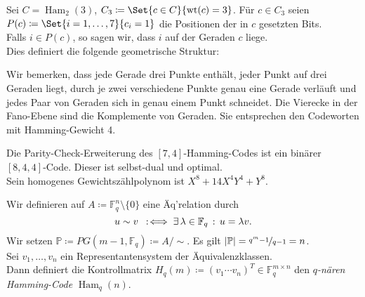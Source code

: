 \documentclass{cheat-sheet}
\newcommand{\F}{\mathbb{F}} %
\DeclareMathOperator{\wt}{wt} %
\DeclareMathOperator{\Ham}{Ham} %
\newcommand{\Proj}{\mathbb{P}} %
\begin{document}
\begin{bem}
  Sei $C = \Ham_2(3)$, $C_3 \coloneqq \Set{c \in C}{\wt(c) = 3}$.
  Für $c \in C_3$ seien $P(c) \coloneqq \Set{i = 1, \ldots, 7}{c_i = 1}$ die Positionen der in $c$ gesetzten Bits. \\
  Falls $i \in P(c)$, so sagen wir, dass $i$ auf der Geraden $c$ liege. \\
  Dies definiert die folgende geometrische Struktur:
\begin{center}
\end{center}
  Wir bemerken, dass jede Gerade drei Punkte enthält, jeder Punkt auf drei Geraden liegt, durch je zwei verschiedene Punkte genau eine Gerade verläuft und jedes Paar von Geraden sich in genau einem Punkt schneidet.
  Die Vierecke in der Fano-Ebene sind die Komplemente von Geraden.
  Sie entsprechen den Codeworten mit Hamming-Gewicht 4.
\end{bem}


\begin{satz}
  Die Parity-Check-Erweiterung des $[7, 4]$-Hamming-Codes ist ein binärer $[8, 4, 4]$-Code.
  Dieser ist selbst-dual und optimal. \\
  Sein homogenes Gewichtszählpolynom ist $X^8 + 14 X^4 Y^4 + Y^8$.
\end{satz}


\begin{konstr}
  Wir definieren auf $A \coloneqq \F_q^n \setminus \{ 0 \}$ eine Äq'relation durch
  \[ u \sim v \coloniff \ex{\lambda \in \F_q} u = \lambda v. \]
  Wir setzen $\Proj \coloneqq PG(m-1, \F_q) \coloneqq A/{\sim}$.
  Es gilt $\abs{\Proj} = \nicefrac{q^m - 1}{q - 1} = n$. \\
  Sei $v_1, \ldots, v_n$ ein Representantensystem der Äquivalenzklassen. \\
  Dann definiert die Kontrollmatrix $H_q(m) \coloneqq (v_1 \cdots v_n)^T \in \F_q^{m \times n}$ den \emph{$q$-nären Hamming-Code} $\Ham_q(n)$.
\end{konstr}
\end{document}
